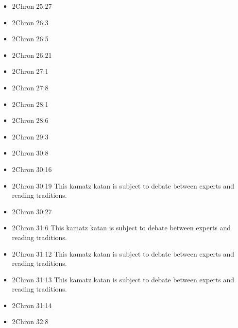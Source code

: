 \documentclass[14pt]{book}
\begin{document}
\begin{multicols}{2}
\begin{itemize}
				\item 2Chron 25:27
				
				\item 2Chron 26:3
				
				\item 2Chron 26:5
				
				\item 2Chron 26:21
				
				\item 2Chron 27:1
				
				\item 2Chron 27:8
				
				\item 2Chron 28:1
				
				\item 2Chron 28:6
				
				\item 2Chron 29:3
			
				
				\item 2Chron 30:8
				
				\item 2Chron 30:16
				
				\item 2Chron 30:19 This kamatz katan is subject to debate between experts and reading traditions.
				
				\item 2Chron 30:27
				
				\item 2Chron 31:6 This kamatz katan is subject to debate between experts and reading traditions.
				
				\item 2Chron 31:12 This kamatz katan is subject to debate between experts and reading traditions.
				
				\item 2Chron 31:13 This kamatz katan is subject to debate between experts and reading traditions.
				
				\item 2Chron 31:14
				
				\item 2Chron 32:8
				

\end{itemize}
\end{multicols}
\end{document}
